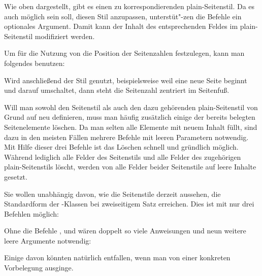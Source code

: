 Wie oben dargestellt, gibt es einen zu 
korrespondierenden plain-Seitenstil.  Da es auch möglich sein soll, diesen
Stil anzupassen, unterstüt"-zen die Befehle ein optionales Argument.  Damit
kann der Inhalt des entsprechenden Feldes im plain-Seitenstil modifiziert
werden.

\begin{Example}
  Um für die Nutzung von  die Position der Seitenzahlen
  festzulegen, kann man folgendes benutzen:
\begin{lstcode}
  \cfoot[\pagemark]{}
  \ohead[]{\pagemark}
\end{lstcode}
  Wird anschließend der Stil  genutzt, beispielsweise weil
   eine neue Seite beginnt und darauf umschaltet, dann steht
  die Seitenzahl zentriert im Seitenfuß.
\end{Example}
%
\EndIndexGroup


\begin{Declaration}
\end{Declaration}%
Will man sowohl den Seitenstil  als auch den dazu
gehörenden plain-Seitenstil von Grund auf neu definieren,
muss man häufig zusätzlich einige der bereits belegten Seitenelemente
löschen.  Da man selten alle Elemente mit neuem Inhalt füllt, sind
dazu in den meisten Fällen mehrere Befehle mit leeren Parametern
notwendig.
Mit Hilfe dieser drei Befehle ist das Löschen schnell und
gründlich möglich. Während  lediglich alle
Felder des Seitenstils  und 
alle Felder des zugehörigen plain-Seitenstils löscht, werden
von  alle Felder beider Seitenstile auf leere
Inhalte gesetzt.
\begin{Example}
  Sie wollen unabhängig davon, wie die Seitenstile derzeit aussehen,
  die Standardform der \KOMAScript-Klassen bei zweiseitigem Satz
  erreichen. Dies ist mit nur drei Befehlen möglich:
\begin{lstcode}
  \clearscrheadfoot
  \ohead{\headmark}
  \ofoot[\pagemark]{\pagemark}
\end{lstcode}
  Ohne die Befehle ,  und
   wären doppelt so viele Anweisungen und neun weitere
  leere Argumente notwendig:
\begin{lstcode}
  \ihead[]{}
  \chead[]{}
  \ohead[]{\headmark}
  \ifoot[]{}
  \cfoot[]{}
  \ofoot[\pagemark]{\pagemark}
\end{lstcode}
  Einige davon könnten natürlich entfallen, wenn man von einer
  konkreten Vorbelegung ausginge.
\end{Example}
%
\EndIndexGroup
%
\EndIndexGroup


